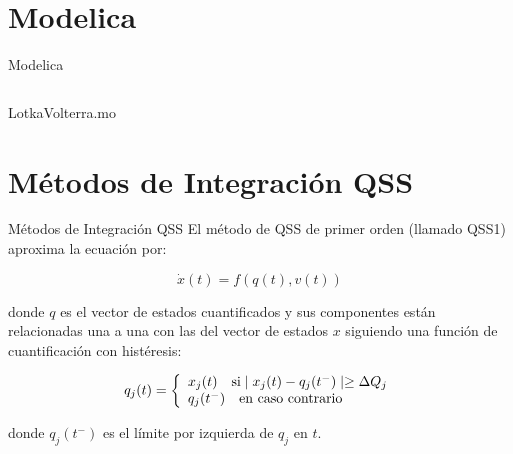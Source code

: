 \documentclass{beamer}
\begin{document}


\section{Modelica}
\begin{frame}[fragile]{Modelica}
\centering
\begin{listing}[H]    
	\inputminted[linenos]{modelica}{src/LotkaVolterra.mo}
	\caption{LotkaVolterra.mo}\label{lst:LotkaVolterra.mo}
\end{listing}
\end{frame}

\section{Métodos de Integración QSS}
\begin{frame}{Métodos de Integración QSS}
	El método de QSS de primer orden (llamado QSS1) aproxima la ecuación por:
	
	\begin{equation*}
	\dot{x}(t) = f (q(t), v(t))
	\end{equation*}
	
	donde $q$ es el vector de estados cuantificados y sus componentes están relacionadas una a una con las del vector de estados $x$ siguiendo una 
	función de cuantificación con histéresis:
	
	\begin{equation*}
	q_j(t) = \left\{ 
	  \begin{array}{l l}
	    x_j(t)  \quad \text{si} \mid x_j (t ) - q_j (t^{-} ) \mid \geq \Delta Q_j \\
	    q_j (t^{-} ) \quad \text{en caso contrario}
	  \end{array} \right.
	\end{equation*}
	
	donde $q_j (t^{-})$ es el límite por izquierda de $q_j$ en $t$.
\end{frame}
\end{document}
